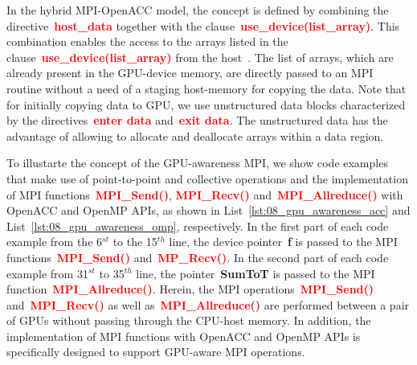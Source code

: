 \par
In the hybrid MPI-OpenACC model, the concept is defined by combining the directive~\textbf{\textcolor{red}{host\_data}} together with the clause~\textbf{\textcolor{red}{use\_device(list\_array)}}.
This combination enables the access to the arrays listed in the clause~\textbf{\textcolor{red}{use\_device(list\_array)}} from the host~\cite{openacc_u_device}.
The list of arrays, which are already present in the GPU-device memory, are directly passed to an MPI routine without a need of a staging host-memory for copying the data.
Note that for initially copying data to GPU, we use unstructured data blocks characterized by the directives~\textbf{\textcolor{red}{enter data}} and~\textbf{\textcolor{red}{exit data}}.
The unstructured data has the advantage of allowing to allocate and deallocate arrays within a data region.


\par
To illustarte the concept of the GPU-awareness MPI, we show code examples that make use of point-to-point and collective operations and the implementation of MPI functions~\textbf{\textcolor{red}{MPI\_Send()}}, \textbf{\textcolor{red}{MPI\_Recv()}} and~\textbf{\textcolor{red}{MPI\_Allreduce()}} with OpenACC and OpenMP APIs, as shown in List~\ref{lst:08_gpu_awareness_acc} and List~\ref{lst:08_gpu_awareness_omp}, respectively.
In the first part of each code example from the 6$^{st}$ to the 15$^{th}$ line, the device pointer~\textbf{f} is passed to the MPI functions~\textbf{\textcolor{red}{MPI\_Send()}} and~\textbf{\textcolor{red}{MP\_Recv()}}.
In the second part of each code example from 31$^{st}$ to 35$^{th}$ line, the pointer~\textbf{SumToT} is passed to the MPI function~\textbf{\textcolor{red}{MPI\_Allreduce()}}.
Herein, the MPI operations~\textbf{\textcolor{red}{MPI\_Send()}} and~\textbf{\textcolor{red}{MPI\_Recv()}} as well as~\textbf{\textcolor{red}{MPI\_Allreduce()}} are performed between a pair of GPUs without passing through the CPU-host memory.
In addition, the implementation of MPI functions with OpenACC and OpenMP APIs is specifically designed to support GPU-aware MPI operations.








